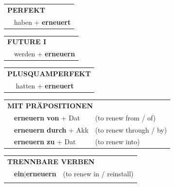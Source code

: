 \documentclass[10pt,a4paper]{revtex4-2}
\begin{document}
\begin{verbbox}
 \vspace{10pt}

 \begin{tabular}{rl}
     \multicolumn{2}{l}{\textbf{PERFEKT}}\\
   & haben + \textbf{erneuert}\\
  \end{tabular}
\hfill
\begin{tabular}{rl}
    \multicolumn{2}{l}{\textbf{FUTURE I}}\\
   & werden + \textbf{erneuern}\\
  \end{tabular}
\hfill
\begin{tabular}{rl}
    \multicolumn{2}{l}{\textbf{PLUSQUAMPERFEKT}}\\
   & hatten + \textbf{erneuert}\\
  \end{tabular}

 \vspace{10pt}

\begin{tabular}{lll}
      \multicolumn{3}{l}{\textbf{MIT PRÄPOSITIONEN}}\\
& \textbf{erneuern von} + Dat & (to renew from / of)\\
& \textbf{erneuern durch} + Akk & (to renew through / by)\\
& \textbf{erneuern zu} + Dat & (to renew into)\\
\end{tabular}
  \hfill
\begin{tabular}{lll}
      \multicolumn{3}{l}{\textbf{TRENNBARE VERBEN}}\\
 & \textbf{ein$|$erneuern} & (to renew in / reinstall)\\
\vspace{20pt}
  \end{tabular}


\vspace{-5pt}
\end{verbbox}
\end{document}
